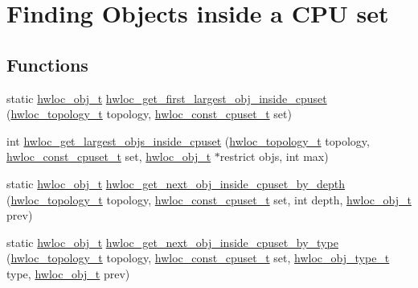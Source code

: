 \hypertarget{a00195}{}\section{Finding Objects inside a C\+PU set}
\label{a00195}
\subsection*{Functions}
\begin{DoxyCompactItemize}
\item 
static \hyperlink{a00185_ga79b8ab56877ef99ac59b833203391c7d}{hwloc\+\_\+obj\+\_\+t} \hyperlink{a00195_ga547325a4193dbc215d07c23097519d79}{hwloc\+\_\+get\+\_\+first\+\_\+largest\+\_\+obj\+\_\+inside\+\_\+cpuset} (\hyperlink{a00186_ga9d1e76ee15a7dee158b786c30b6a6e38}{hwloc\+\_\+topology\+\_\+t} topology, \hyperlink{a00183_ga1f784433e9b606261f62d1134f6a3b25}{hwloc\+\_\+const\+\_\+cpuset\+\_\+t} set)
\item 
int \hyperlink{a00195_ga34ca563fa3a6a4e05268f36a87668511}{hwloc\+\_\+get\+\_\+largest\+\_\+objs\+\_\+inside\+\_\+cpuset} (\hyperlink{a00186_ga9d1e76ee15a7dee158b786c30b6a6e38}{hwloc\+\_\+topology\+\_\+t} topology, \hyperlink{a00183_ga1f784433e9b606261f62d1134f6a3b25}{hwloc\+\_\+const\+\_\+cpuset\+\_\+t} set, \hyperlink{a00185_ga79b8ab56877ef99ac59b833203391c7d}{hwloc\+\_\+obj\+\_\+t} $\ast$restrict objs, int max)
\item 
static \hyperlink{a00185_ga79b8ab56877ef99ac59b833203391c7d}{hwloc\+\_\+obj\+\_\+t} \hyperlink{a00195_ga63e3784e7c60fbae5073428cb98ac787}{hwloc\+\_\+get\+\_\+next\+\_\+obj\+\_\+inside\+\_\+cpuset\+\_\+by\+\_\+depth} (\hyperlink{a00186_ga9d1e76ee15a7dee158b786c30b6a6e38}{hwloc\+\_\+topology\+\_\+t} topology, \hyperlink{a00183_ga1f784433e9b606261f62d1134f6a3b25}{hwloc\+\_\+const\+\_\+cpuset\+\_\+t} set, int depth, \hyperlink{a00185_ga79b8ab56877ef99ac59b833203391c7d}{hwloc\+\_\+obj\+\_\+t} prev)
\item 
static \hyperlink{a00185_ga79b8ab56877ef99ac59b833203391c7d}{hwloc\+\_\+obj\+\_\+t} \hyperlink{a00195_gafe859176cf9233f215fea0e87cef47e7}{hwloc\+\_\+get\+\_\+next\+\_\+obj\+\_\+inside\+\_\+cpuset\+\_\+by\+\_\+type} (\hyperlink{a00186_ga9d1e76ee15a7dee158b786c30b6a6e38}{hwloc\+\_\+topology\+\_\+t} topology, \hyperlink{a00183_ga1f784433e9b606261f62d1134f6a3b25}{hwloc\+\_\+const\+\_\+cpuset\+\_\+t} set, \hyperlink{a00184_gacd37bb612667dc437d66bfb175a8dc55}{hwloc\+\_\+obj\+\_\+type\+\_\+t} type, \hyperlink{a00185_ga79b8ab56877ef99ac59b833203391c7d}{hwloc\+\_\+obj\+\_\+t} prev)

\end{DoxyCompactItemize}
